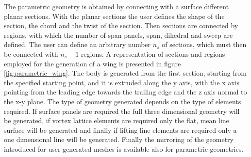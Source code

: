 The parametric geometry is obtained by connecting with a surface different planar sections. 
With the planar sections the user defines the shape of the section, the chord and the twist of the section. 
Then sections are connected by regions, with which the number of span panels, span, dihedral and sweep are defined. 
The user can define an arbitrary number $n_s$ of sections, which must then be connected with $n_s-1$ regions. 
A representation of sections and regions employed for the generation of a wing is presented in figure \ref{fig:parametric_wing}. 
The body is generated from the first section, starting from the specified starting point, and it is extruded along the y axis, 
with the x axis pointing from the leading edge towards the trailing edge and the z axis normal to the x-y plane. 
The type of geometry generated depends on the type of elements required. If surface panels are required the full 
three dimensional geometry will be generated, if vortex lattice elements are required only the flat, mean line 
surface will be generated and finally if lifting line elements are required only a one dimensional line will be generated. 
Finally the mirroring of the geometry introduced for user generated meshes is available also for parametric geometries.

